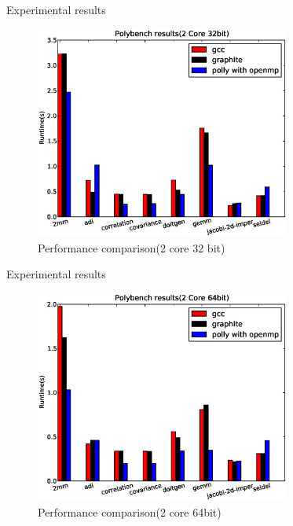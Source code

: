 \documentclass{beamer}
\begin{document}
\begin{frame}{Experimental results}
\begin{figure}
\begin{center}
  \includegraphics[height=7cm]{images/2core32bit.eps}
  \caption{Performance comparison(2 core 32 bit)}
  \label{fig:2core1}
\end{center}
\end{figure}
\end{frame}

\begin{frame}{Experimental results}
\begin{figure}
\begin{center}
  \includegraphics[height=7cm]{images/2core64bit.eps}
  \caption{Performance comparison(2 core 64bit)}
  \label{fig:2core2}
\end{center}
\end{figure}
\end{frame}
\end{document}
